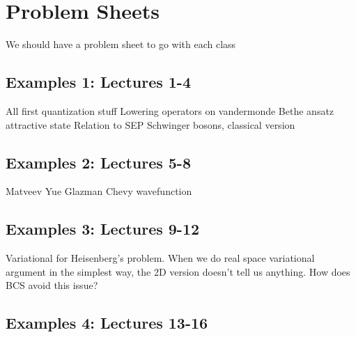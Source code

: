\section{Problem Sheets}


We should have a problem sheet to go with each class

\subsection{Examples 1: Lectures 1-4}

All first quantization stuff
Lowering operators on vandermonde
Bethe ansatz attractive state
Relation to SEP
Schwinger bosons, classical version

\subsection{Examples 2: Lectures 5-8}

Matveev Yue Glazman
Chevy wavefunction

\subsection{Examples 3: Lectures 9-12}

Variational for Heisenberg's problem. When we do real space variational argument in the simplest way, the 2D version doesn't tell us anything. How does BCS avoid this issue?


\subsection{Examples 4: Lectures 13-16}



